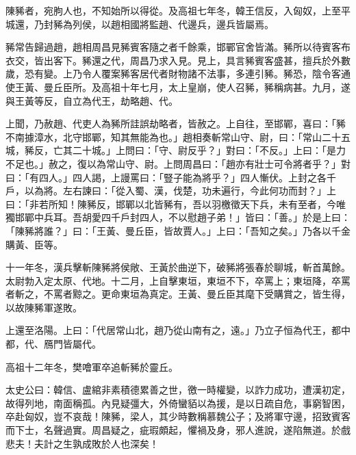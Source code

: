 \begin{pinyinscope}
陳豨者，宛朐人也，不知始所以得從。及高祖七年冬，韓王信反，入匈奴，上至平城還，乃封豨為列侯，以趙相國將監趙、代邊兵，邊兵皆屬焉。

豨常告歸過趙，趙相周昌見豨賓客隨之者千餘乘，邯鄲官舍皆滿。豨所以待賓客布衣交，皆出客下。豨還之代，周昌乃求入見。見上，具言豨賓客盛甚，擅兵於外數歲，恐有變。上乃令人覆案豨客居代者財物諸不法事，多連引豨。豨恐，陰令客通使王黃、曼丘臣所。及高祖十年七月，太上皇崩，使人召豨，豨稱病甚。九月，遂與王黃等反，自立為代王，劫略趙、代。

上聞，乃赦趙、代吏人為豨所詿誤劫略者，皆赦之。上自往，至邯鄲，喜曰：「豨不南據漳水，北守邯鄲，知其無能為也。」趙相奏斬常山守、尉，曰：「常山二十五城，豨反，亡其二十城。」上問曰：「守、尉反乎？」對曰：「不反。」上曰：「是力不足也。」赦之，復以為常山守、尉。上問周昌曰：「趙亦有壯士可令將者乎？」對曰：「有四人。」四人謁，上謾罵曰：「豎子能為將乎？」四人慚伏。上封之各千戶，以為將。左右諫曰：「從入蜀、漢，伐楚，功未遍行，今此何功而封？」上曰：「非若所知！陳豨反，邯鄲以北皆豨有，吾以羽檄徵天下兵，未有至者，今唯獨邯鄲中兵耳。吾胡愛四千戶封四人，不以慰趙子弟！」皆曰：「善。」於是上曰：「陳豨將誰？」曰：「王黃、曼丘臣，皆故賈人。」上曰：「吾知之矣。」乃各以千金購黃、臣等。

十一年冬，漢兵擊斬陳豨將侯敞、王黃於曲逆下，破豨將張春於聊城，斬首萬餘。太尉勃入定太原、代地。十二月，上自擊東垣，東垣不下，卒罵上；東垣降，卒罵者斬之，不罵者黥之。更命東垣為真定。王黃、曼丘臣其麾下受購賞之，皆生得，以故陳豨軍遂敗。

上還至洛陽。上曰：「代居常山北，趙乃從山南有之，遠。」乃立子恒為代王，都中都，代、鴈門皆屬代。

高祖十二年冬，樊噲軍卒追斬豨於靈丘。

太史公曰：韓信、盧綰非素積德累善之世，徼一時權變，以詐力成功，遭漢初定，故得列地，南面稱孤。內見疑彊大，外倚蠻貊以為援，是以日疏自危，事窮智困，卒赴匈奴，豈不哀哉！陳豨，梁人，其少時數稱慕魏公子；及將軍守邊，招致賓客而下士，名聲過實。周昌疑之，疵瑕頗起，懼禍及身，邪人進說，遂陷無道。於戲悲夫！夫計之生孰成敗於人也深矣！


\end{pinyinscope}